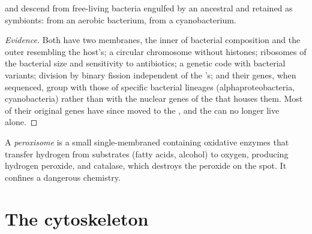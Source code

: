 \begin{proposition}\label{prop:b1:eukaryotic-cell:endosymbiosis}
 and  descend from free-living bacteria engulfed by
an ancestral  and retained as symbionts: 
from an aerobic bacterium,  from a cyanobacterium.
\end{proposition}
\begin{proof}[Evidence]
Both  have two membranes, the inner of bacterial composition
and the outer resembling the host's; a circular chromosome without
histones; ribosomes of the bacterial size and sensitivity to
antibiotics; a genetic code with bacterial variants; division by
binary fission independent of the 's; and their genes, when
sequenced, group with those of specific bacterial lineages
(alphaproteobacteria, cyanobacteria) rather than with the nuclear
genes of the  that houses them. Most of their original genes have
since moved to the , and the  can no longer live
alone.
\end{proof}

\begin{definition}[Peroxisome]\label{def:b1:eukaryotic-cell:peroxisome}
A \emph{peroxisome} is a small single-membraned
 containing oxidative enzymes that transfer hydrogen from
substrates (fatty acids, alcohol) to oxygen, producing hydrogen
peroxide, and catalase, which destroys the peroxide on the spot. It
confines a dangerous chemistry.
\end{definition}

\section{The cytoskeleton}

